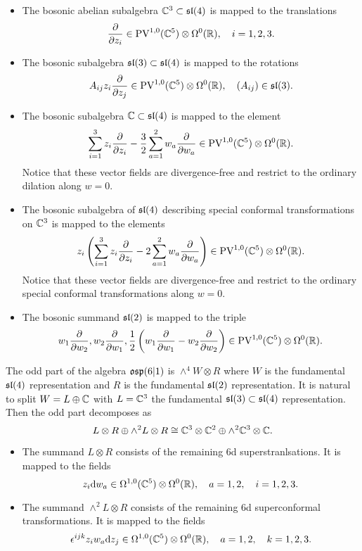 \begin{itemize}

\item
The bosonic abelian subalgebra $\mathbb C^3 \subset \mathfrak{sl}(4)$ is mapped to the translations 
\[
\frac{\partial}{\partial z_i} \in {\rm PV}^{1,0}(\mathbb C^5) \otimes \Omega^0(\mathbb R) , \quad i=1,2,3.
\]

\item
The bosonic subalgebra $\mathfrak{sl}(3) \subset \mathfrak{sl}(4)$ is mapped to the 
rotations
\[
A_{ij} z_i \frac{\partial}{\partial z_j} \in {\rm PV}^{1,0}(\mathbb C^5)\otimes \Omega^0(\mathbb R) , \quad (A_{ij}) \in \mathfrak{sl}(3) .
\]

\item
The bosonic subalgebra $\mathbb C \subset \mathfrak{sl}(4)$ is mapped to the element
\[
\sum_{i=1}^3 z_i \frac{\partial}{\partial z_i} - \frac32 \sum_{a=1}^2 w_a \frac{\partial}{\partial w_a} \in {\rm PV}^{1,0}(\mathbb C^5) \otimes \Omega^0(\mathbb R)  .
\] 
Notice that these vector fields are divergence-free and restrict to the ordinary dilation along $w=0$. 
\item 
The bosonic subalgebra of $\mathfrak{sl}(4)$ describing special conformal transformations on $\mathbb C^3$ is mapped to the elements 
\[
z_i \left(\sum_{i=1}^3 z_i \frac{\partial}{\partial z_i} - 2 \sum_{a=1}^2 w_a \frac{\partial}{\partial w_a} \right) \in {\rm PV}^{1,0}(\mathbb C^5) \otimes \Omega^0(\mathbb R) .
\] 
Notice that these vector fields are divergence-free and restrict to the ordinary special conformal transformations along $w=0$. 
\item 
The bosonic summand $\mathfrak{sl}(2)$ is mapped to the triple
\[
w_1 \frac{\partial}{\partial w_2}, w_2 \frac{\partial}{\partial w_1}, \frac12 \left(w_1 \frac{\partial}{\partial w_1} - w_2 \frac{\partial}{\partial w_2}\right) \in {\rm PV}^{1,0}(\mathbb C^5) \otimes \Omega^0(\mathbb R) .
\]
\end{itemize}

The odd part of the algebra $\mathfrak{osp}(6|1)$ is $\wedge^4 W \otimes R$ where $W$ is the fundamental $\mathfrak{sl}(4)$ representation and $R$ is the fundamental $\mathfrak{sl}(2)$ representation. 
It is natural to split $W = L \oplus \mathbb C$ with $L = \mathbb C^3$ the fundamental $\mathfrak{sl}(3) \subset \mathfrak{sl}(4)$ representation. 
Then the odd part decomposes as
\[
L \otimes R \oplus \wedge^2 L \otimes R \cong \mathbb C^3 \otimes \mathbb C^2 \oplus \wedge^2 \mathbb C^3 \otimes \mathbb C .
\]

\begin{itemize} 
\item The summand $L \otimes R$ consists of the remaining 6d superstranlsations. 
It is mapped to the fields 
\[
z_i {\rm d} w_a \in \Omega^{1,0}(\mathbb C^5) \otimes \Omega^0(\mathbb R) ,\quad a=1,2, \quad i =1,2,3.
\] 
\item The summand $\wedge^2 L \otimes R$ consists of the remaining 6d superconformal transformations. 
It is mapped to the fields
\[
\epsilon^{ijk} z_i w_a {\rm d} z_j \in \Omega^{1,0}(\mathbb C^5)\otimes \Omega^0(\mathbb R) , \quad a = 1,2, \quad k = 1,2,3. 
\]
\end{itemize}

